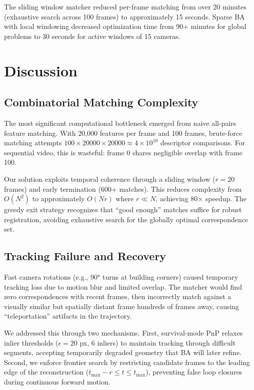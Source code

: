 \documentclass[10pt,twocolumn,letterpaper]{article}
\begin{document}
The sliding window matcher reduced per-frame matching from over 20 minutes (exhaustive search across 100 frames) to approximately 15 seconds. Sparse BA with local windowing decreased optimization time from 90+ minutes for global problems to 30 seconds for active windows of 15 cameras.

\section{Discussion}

\subsection{Combinatorial Matching Complexity}

The most significant computational bottleneck emerged from naive all-pairs feature matching. With 20,000 features per frame and 100 frames, brute-force matching attempts $100 \times 20000 \times 20000 \approx 4 \times 10^{10}$ descriptor comparisons. For sequential video, this is wasteful: frame 0 shares negligible overlap with frame 100.

Our solution exploits temporal coherence through a sliding window ($r=20$ frames) and early termination (600+ matches). This reduces complexity from $O(N^2)$ to approximately $O(Nr)$ where $r \ll N$, achieving 80× speedup. The greedy exit strategy recognizes that ``good enough'' matches suffice for robust registration, avoiding exhaustive search for the globally optimal correspondence set.

\subsection{Tracking Failure and Recovery}

Fast camera rotations (e.g., 90° turns at building corners) caused temporary tracking loss due to motion blur and limited overlap. The matcher would find zero correspondences with recent frames, then incorrectly match against a visually similar but spatially distant frame hundreds of frames away, causing ``teleportation'' artifacts in the trajectory.

We addressed this through two mechanisms. First, survival-mode PnP relaxes inlier thresholds ($\epsilon = 20$ px, 6 inliers) to maintain tracking through difficult segments, accepting temporarily degraded geometry that BA will later refine. Second, we enforce frontier search by restricting candidate frames to the leading edge of the reconstruction ($t_{\max} - r \leq t \leq t_{\max}$), preventing false loop closures during continuous forward motion.
\end{document}
